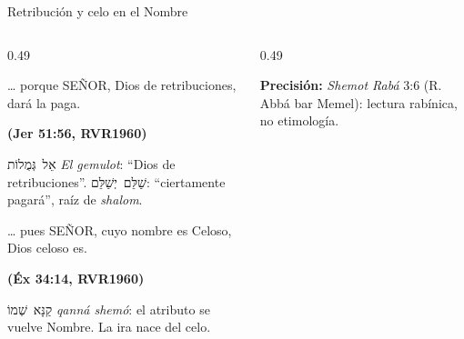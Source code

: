 \documentclass[hyperref={bookmarks=false},aspectratio=169]{beamer}
\newcommand{\heb}[1]{\mbox{\foreignlanguage{hebrew}{#1}}}
\newcommand{\SENOR}{S{\fontsize{0.78em}{1em}\selectfont EÑOR}}
\newcommand{\fuente}[1]{\par\hfill{\upshape\bfseries\footnotesize\textcolor{azul}{#1}}}
\newcommand{\precision}[1]{{\footnotesize\color{gris}\textbf{Precisión:} #1}}
\begin{document}
\begin{frame}{Retribución y celo en el Nombre}
\begin{columns}[c,onlytextwidth]
\begin{column}{0.49\textwidth}
\begin{cita}[fontupper=\scriptsize\itshape]\ldots{} porque \SENOR{}, Dios de retribuciones, dará la paga.\fuente{(Jer 51:56, RVR1960)}\end{cita}
\scriptsize\heb{אֵל גְּמֻלוֹת} \emph{El gemulot}: ``Dios de retribuciones''. \heb{שַׁלֵּם יְשַׁלֵּם}: ``ciertamente pagará'', raíz de \emph{shalom}.
\begin{cita}[fontupper=\scriptsize\itshape]\ldots{} pues \SENOR{}, cuyo nombre es Celoso, Dios celoso es.\fuente{(Éx 34:14, RVR1960)}\end{cita}
\scriptsize\heb{קַנָּא שְׁמוֹ} \emph{qanná shemó}: el atributo se vuelve Nombre. La ira nace del celo.
\end{column}
\begin{column}{0.49\textwidth}
\centering
{}\par\smallskip
\precision{\emph{Shemot Rabá} 3:6 (R. Abbá bar Memel): lectura rabínica, no etimología.}
\end{column}
\end{columns}
\end{frame}
\end{document}
